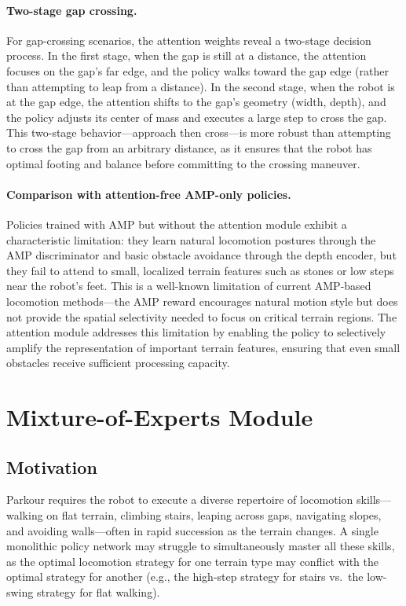 \paragraph{Two-stage gap crossing.}
For gap-crossing scenarios, the attention weights reveal a two-stage decision process. In the first stage, when the gap is still at a distance, the attention focuses on the gap's far edge, and the policy walks toward the gap edge (rather than attempting to leap from a distance). In the second stage, when the robot is at the gap edge, the attention shifts to the gap's geometry (width, depth), and the policy adjusts its center of mass and executes a large step to cross the gap. This two-stage behavior---approach then cross---is more robust than attempting to cross the gap from an arbitrary distance, as it ensures that the robot has optimal footing and balance before committing to the crossing maneuver.

\paragraph{Comparison with attention-free AMP-only policies.}
Policies trained with AMP but without the attention module exhibit a characteristic limitation: they learn natural locomotion postures through the AMP discriminator and basic obstacle avoidance through the depth encoder, but they fail to attend to small, localized terrain features such as stones or low steps near the robot's feet. This is a well-known limitation of current AMP-based locomotion methods---the AMP reward encourages natural motion style but does not provide the spatial selectivity needed to focus on critical terrain regions. The attention module addresses this limitation by enabling the policy to selectively amplify the representation of important terrain features, ensuring that even small obstacles receive sufficient processing capacity.

\section{Mixture-of-Experts Module}
\label{sec:moe_module}

\subsection{Motivation}

Parkour requires the robot to execute a diverse repertoire of locomotion skills---walking on flat terrain, climbing stairs, leaping across gaps, navigating slopes, and avoiding walls---often in rapid succession as the terrain changes. A single monolithic policy network may struggle to simultaneously master all these skills, as the optimal locomotion strategy for one terrain type may conflict with the optimal strategy for another (e.g., the high-step strategy for stairs vs.\ the low-swing strategy for flat walking).

